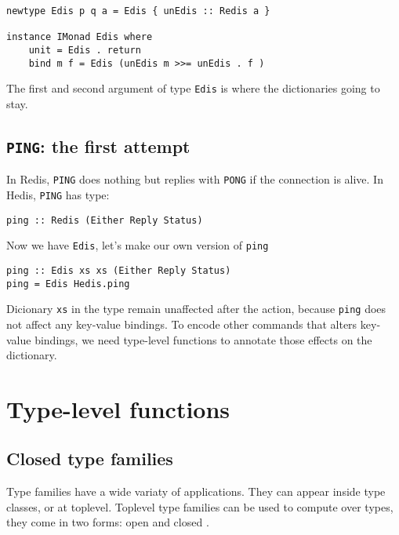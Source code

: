 \documentclass[pldi]{sigplanconf-pldi16}
\begin{document}
\begin{verbatim}
newtype Edis p q a = Edis { unEdis :: Redis a }

instance IMonad Edis where
    unit = Edis . return
    bind m f = Edis (unEdis m >>= unEdis . f )
\end{verbatim}

The first and second argument of type \texttt{Edis} is where the
dictionaries going to stay.

\subsection{\texttt{PING}: the first attempt}

In Redis, \texttt{PING} does nothing but replies with
\texttt{PONG} if the connection is alive. In Hedis,
\texttt{PING} has type:

\begin{verbatim}
ping :: Redis (Either Reply Status)
\end{verbatim}

Now we have \texttt{Edis}, let's make our own version of
\texttt{ping}\footnotemark


\begin{verbatim}
ping :: Edis xs xs (Either Reply Status)
ping = Edis Hedis.ping
\end{verbatim}

Dicionary \texttt{xs} in the type remain unaffected after the
action, because \texttt{ping} does not affect any key-value
bindings. To encode other commands that alters key-value bindings, we need
 type-level functions to annotate those effects on the dictionary.

\section{Type-level functions}
\subsection{Closed type families}

Type families have a wide variaty of applications. They can appear inside type
classes\cite{tfclass}\cite{tfsynonym}, or at toplevel. Toplevel type families
can be used to compute over types, they come in two forms: open\cite{tfopen} and
closed \cite{tfclosed}.
\end{document}
